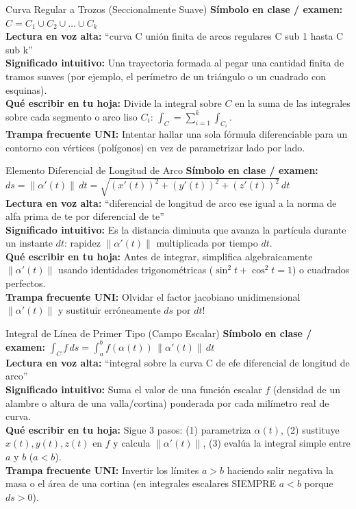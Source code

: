 \documentclass[11pt,a4paper]{article}
\begin{document}
\begin{definicionbox}{Curva Regular a Trozos (Seccionalmente Suave)}
\textbf{Símbolo en clase / examen:} $C = C_1 \cup C_2 \cup \dots \cup C_k$\\[0.15cm]
\textbf{Lectura en voz alta:} ``curva C unión finita de arcos regulares C sub 1 hasta C sub k''\\[0.12cm]
\textbf{Significado intuitivo:} Una trayectoria formada al pegar una cantidad finita de tramos suaves (por ejemplo, el perímetro de un triángulo o un cuadrado con esquinas).\\[0.12cm]
\textbf{Qué escribir en tu hoja:} Divide la integral sobre $C$ en la suma de las integrales sobre cada segmento o arco liso $C_i$: $\int_C = \sum_{i=1}^k \int_{C_i}$.\\[0.12cm]
\textbf{Trampa frecuente UNI:} Intentar hallar una sola fórmula diferenciable para un contorno con vértices (polígonos) en vez de parametrizar lado por lado.
\end{definicionbox}

\begin{definicionbox}{Elemento Diferencial de Longitud de Arco}
\textbf{Símbolo en clase / examen:} $ds = \|\alpha'(t)\|\,dt = \sqrt{(x'(t))^2 + (y'(t))^2 + (z'(t))^2}\,dt$\\[0.15cm]
\textbf{Lectura en voz alta:} ``diferencial de longitud de arco ese igual a la norma de alfa prima de te por diferencial de te''\\[0.12cm]
\textbf{Significado intuitivo:} Es la distancia diminuta que avanza la partícula durante un instante $dt$: rapidez $\|\alpha'(t)\|$ multiplicada por tiempo $dt$.\\[0.12cm]
\textbf{Qué escribir en tu hoja:} Antes de integrar, simplifica algebraicamente $\|\alpha'(t)\|$ usando identidades trigonométricas ($\sin^2 t + \cos^2 t = 1$) o cuadrados perfectos.\\[0.12cm]
\textbf{Trampa frecuente UNI:} Olvidar el factor jacobiano unidimensional $\|\alpha'(t)\|$ y sustituir erróneamente $ds$ por $dt$!
\end{definicionbox}

\begin{definicionbox}{Integral de Línea de Primer Tipo (Campo Escalar)}
\textbf{Símbolo en clase / examen:} $\int_C f\,ds = \int_a^b f(\alpha(t))\,\|\alpha'(t)\|\,dt$\\[0.15cm]
\textbf{Lectura en voz alta:} ``integral sobre la curva C de efe diferencial de longitud de arco''\\[0.12cm]
\textbf{Significado intuitivo:} Suma el valor de una función escalar $f$ (densidad de un alambre o altura de una valla/cortina) ponderada por cada milímetro real de curva.\\[0.12cm]
\textbf{Qué escribir en tu hoja:} Sigue 3 pasos: (1) parametriza $\alpha(t)$, (2) sustituye $x(t),y(t),z(t)$ en $f$ y calcula $\|\alpha'(t)\|$, (3) evalúa la integral simple entre $a$ y $b$ ($a < b$).\\[0.12cm]
\textbf{Trampa frecuente UNI:} Invertir los límites $a > b$ haciendo salir negativa la masa o el área de una cortina (en integrales escalares SIEMPRE $a < b$ porque $ds > 0$).
\end{definicionbox}
\end{document}
